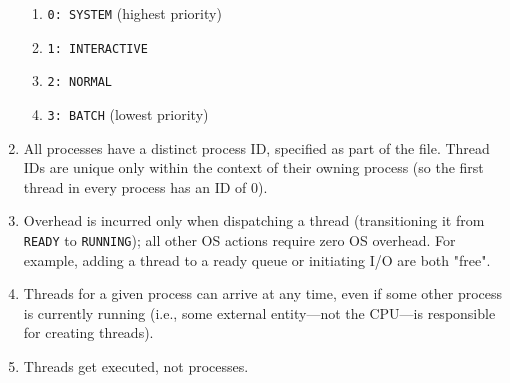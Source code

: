 \documentclass[main.tex]{subfiles}
\begin{document}
\begin{enumerate}
    \begin{enumerate}
        \item \texttt{0: SYSTEM} (highest priority)
        \item \texttt{1: INTERACTIVE}
        \item \texttt{2: NORMAL}
        \item \texttt{3: BATCH} (lowest priority)
    \end{enumerate}
    \item All processes have a distinct process ID, specified as part of the file. Thread IDs are unique only within the context of their owning process (so the first thread in every process has an ID of 0).
    \item Overhead is incurred only when dispatching a thread (transitioning it from \texttt{READY} to \texttt{RUNNING}); all other OS actions require zero OS overhead. For example, adding a thread to a ready queue or initiating I/O are both "free".
    \item Threads for a given process can arrive at any time, even if some other process is currently running (i.e., some external entity---not the CPU---is responsible for creating threads).
    \item Threads get executed, not processes.
\end{enumerate}
\end{document}
